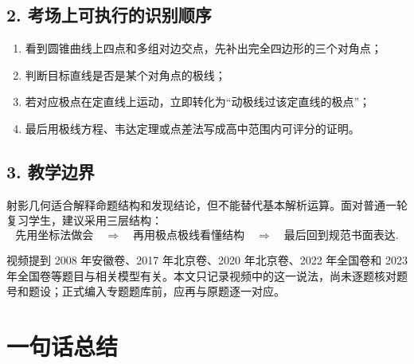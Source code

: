 \documentclass[UTF8,11pt]{ctexart}
\begin{document}
\subsection*{2. 考场上可执行的识别顺序}

\begin{enumerate}
\item 看到圆锥曲线上四点和多组对边交点，先补出完全四边形的三个对角点；
\item 判断目标直线是否是某个对角点的极线；
\item 若对应极点在定直线上运动，立即转化为“动极线过该定直线的极点”；
\item 最后用极线方程、韦达定理或点差法写成高中范围内可评分的证明。
\end{enumerate}

\subsection*{3. 教学边界}

射影几何适合解释命题结构和发现结论，但不能替代基本解析运算。面对普通一轮复习学生，建议采用三层结构：
\[
\text{先用坐标法做会}
\quad\Longrightarrow\quad
\text{再用极点极线看懂结构}
\quad\Longrightarrow\quad
\text{最后回到规范书面表达}.
\]

视频提到 2008 年安徽卷、2017 年北京卷、2020 年北京卷、2022 年全国卷和 2023 年全国卷等题目与相关模型有关。本文只记录视频中的这一说法，尚未逐题核对题号和题设；正式编入专题题库前，应再与原题逐一对应。

\section*{一句话总结}

\begin{center}
\end{center}
\end{document}
